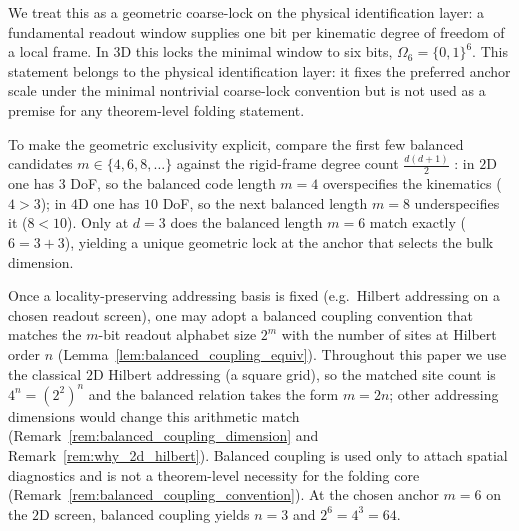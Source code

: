 We treat this as a geometric coarse-lock on the physical identification layer: a fundamental readout window supplies one bit per kinematic degree of freedom of a local frame.
In $3$D this locks the minimal window to six bits, $\Omega_6=\{0,1\}^6$.
This statement belongs to the physical identification layer: it fixes the preferred anchor scale under the minimal nontrivial coarse-lock convention but is not used as a premise for any theorem-level folding statement.

To make the geometric exclusivity explicit, compare the first few balanced candidates $m\in\{4,6,8,\dots\}$ against the rigid-frame degree count $\frac{d(d+1)}{2}$ \cite{HallLieGroups2015}:
in $2$D one has $3$ DoF, so the balanced code length $m=4$ overspecifies the kinematics ($4>3$); in $4$D one has $10$ DoF, so the next balanced length $m=8$ underspecifies it ($8<10$).
Only at $d=3$ does the balanced length $m=6$ match exactly ($6=3+3$), yielding a unique geometric lock at the anchor that selects the bulk dimension.

Once a locality-preserving addressing basis is fixed (e.g.\ Hilbert addressing on a chosen readout screen), one may adopt a balanced coupling convention that matches the $m$-bit readout alphabet size $2^m$ with the number of sites at Hilbert order $n$ (Lemma~\ref{lem:balanced_coupling_equiv}).
Throughout this paper we use the classical $2$D Hilbert addressing (a square grid), so the matched site count is $4^n=(2^2)^n$ and the balanced relation takes the form $m=2n$; other addressing dimensions would change this arithmetic match (Remark~\ref{rem:balanced_coupling_dimension} and Remark~\ref{rem:why_2d_hilbert}).
Balanced coupling is used only to attach spatial diagnostics and is not a theorem-level necessity for the folding core (Remark~\ref{rem:balanced_coupling_convention}).
At the chosen anchor $m=6$ on the $2$D screen, balanced coupling yields $n=3$ and $2^6=4^3=64$.

